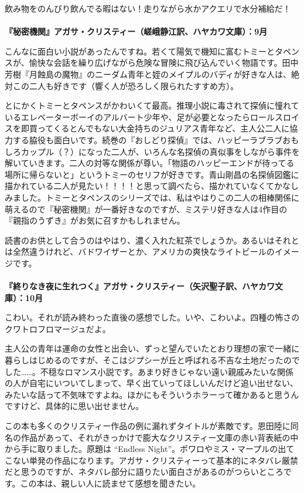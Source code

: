 飲み物をのんびり飲んでる暇はない！走りながら水かアクエリで水分補給だ！
\\
\\
\textbf{『秘密機関』アガサ・クリスティー（嵯峨静江訳、ハヤカワ文庫）：9月}

こんなに面白い小説があったんですね。若くて陽気で機知に富むトミーとタペンスが、愉快な会話を繰り広げながら危険な冒険に飛び込んでいく物語です。田中芳樹『月蝕島の魔物』のニーダム青年と姪のメイプルのバディが好きな人は、絶対この二人も好きです（響く人が恐ろしく限られたすすめ方）。

とにかくトミーとタペンスがかわいくて最高。推理小説に毒されて探偵に憧れているエレベーターボーイのアルバート少年や、足が必要となったらロールスロイスを即買ってくるとんでもない大金持ちのジュリアス青年など、主人公二人に協力する脇役も面白いです。続巻の『おしどり探偵』では、ハッピーラブラブおもしろカップル（？）になった二人が、いろんな名探偵の真似事をしながら事件を解いていきます。二人の対等な関係が尊い。「物語のハッピーエンドが待ってる場所に帰らないと」というトミーのセリフが好きです。青山剛昌の名探偵図鑑に描かれている二人が見たい！！！！と思って調べたら、描かれていなくてかなしみました。トミーとタペンスのシリーズでは、私はやはりこの二人の相棒関係に萌えるので『秘密機関』が一番好きなのですが、ミステリ好きな人は4作目の『親指のうずき』がお気に召すかもしれません。

読書のお供として合うのはやはり、濃く入れた紅茶でしょうか。あるいはそれとは全然違うけれど、バドワイザーとか、アメリカの爽快なライトビールのイメージです。
\\
\\
\textbf{『終りなき夜に生れつく』アガサ・クリスティー（矢沢聖子訳、ハヤカワ文庫）：10月}

こわい。それが読み終わった直後の感想でした。いや、こわいよ。四種の怖さのクワトロフロマージュだよ。

主人公の青年は運命の女性と出会い、ずっと望んでいたとおり理想の家で一緒に暮らしはじめるのですが、そこはジプシーが丘と呼ばれる不吉な土地だったのでした……。不穏なロマンス小説です。あまり好きじゃない遠い親戚みたいな関係の人が自宅にいついてしまって、早く出ていってほしいんだけど追い出せない、みたいな話って不気味ですよね。ほかにもそういうホラーって確かあると思うんですけど、具体的に思い出せません。

この本も多くのクリスティー作品の例に漏れずタイトルが素敵です。恩田陸に同名の作品があって、それがきっかけで膨大なクリスティー文庫の赤い背表紙の中から手に取りました。原題は “Endless Night”。ポワロやミス・マープルの出てこない単発の作品になります。アガサ・クリスティーって基本的にネタバレ厳禁だと思うのですが、ネタバレ部分に語りたい面白さがあるのがつらいところです。この本は、親しい人に読ませて感想を聞きたい。

